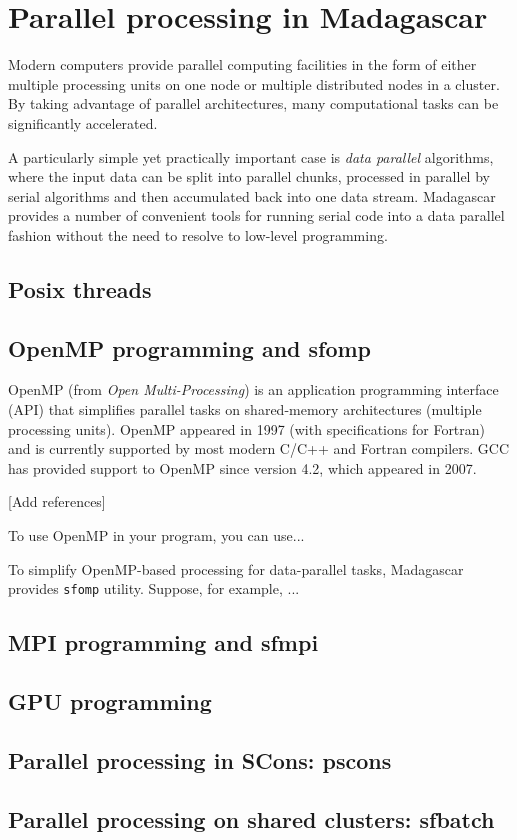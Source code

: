 \chapter{Parallel processing in Madagascar}

Modern computers provide parallel computing facilities in the form of
either multiple processing units on one node or multiple distributed
nodes in a cluster. By taking advantage of parallel architectures,
many computational tasks can be significantly accelerated.

A particularly simple yet practically important case is \emph{data
  parallel} algorithms, where the input data can be split into
parallel chunks, processed in parallel by serial algorithms and then
accumulated back into one data stream. Madagascar provides a number of
convenient tools for running serial code into a data parallel fashion
without the need to resolve to low-level programming.

\section{Posix threads}

\section{OpenMP programming and sfomp}

OpenMP (from \emph{Open Multi-Processing}) is an application
programming interface (API) that simplifies parallel tasks on
shared-memory architectures (multiple processing units). OpenMP
appeared in 1997 (with specifications for Fortran) and is currently
supported by most modern C/C++ and Fortran compilers. GCC has provided
support to OpenMP since version 4.2, which appeared in 2007.

[Add references]

To use OpenMP in your program, you can use...

To simplify OpenMP-based processing for data-parallel tasks,
Madagascar provides \texttt{sfomp} utility. Suppose, for example, ...

\section{MPI programming and sfmpi}

\section{GPU programming}

\section{Parallel processing in SCons: pscons}

\section{Parallel processing on shared clusters: sfbatch} 

